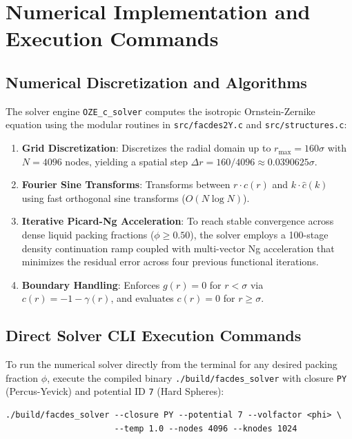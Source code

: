 \documentclass[11pt,a4paper]{article}
\begin{document}
\section{Numerical Implementation and Execution Commands}

\subsection{Numerical Discretization and Algorithms}

The solver engine \texttt{OZE\_c\_solver} computes the isotropic Ornstein-Zernike equation using the modular routines in \texttt{src/facdes2Y.c} and \texttt{src/structures.c}:
\begin{enumerate}
    \item \textbf{Grid Discretization}: Discretizes the radial domain up to $r_{\max} = 160\sigma$ with $N = 4096$ nodes, yielding a spatial step $\Delta r = 160 / 4096 \approx 0.0390625\sigma$.
    \item \textbf{Fourier Sine Transforms}: Transforms between $r \cdot c(r)$ and $k \cdot \hat{c}(k)$ using fast orthogonal sine transforms ($O(N \log N)$).
    \item \textbf{Iterative Picard-Ng Acceleration}: To reach stable convergence across dense liquid packing fractions ($\phi \ge 0.50$), the solver employs a 100-stage density continuation ramp coupled with multi-vector Ng acceleration that minimizes the residual error across four previous functional iterations.
    \item \textbf{Boundary Handling}: Enforces $g(r) = 0$ for $r < \sigma$ via $c(r) = -1 - \gamma(r)$, and evaluates $c(r) = 0$ for $r \ge \sigma$.
\end{enumerate}

\subsection{Direct Solver CLI Execution Commands}

To run the numerical solver directly from the terminal for any desired packing fraction $\phi$, execute the compiled binary \texttt{./build/facdes\_solver} with closure \texttt{PY} (Percus-Yevick) and potential ID \texttt{7} (Hard Spheres):
\begin{verbatim}
./build/facdes_solver --closure PY --potential 7 --volfactor <phi> \
                      --temp 1.0 --nodes 4096 --knodes 1024
\end{verbatim}
\end{document}
